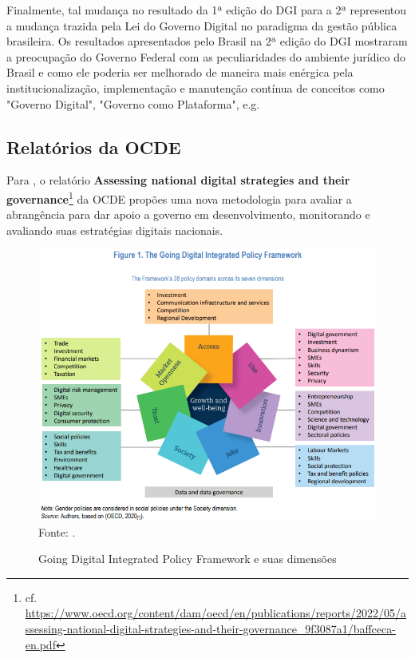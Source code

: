 Finalmente, tal mudança no resultado da 1ª edição do DGI para a 2ª representou a mudança trazida pela Lei do Governo Digital no paradigma da gestão pública brasileira. Os resultados apresentados pelo Brasil na 2ª edição do DGI mostraram a preocupação do Governo Federal com as peculiaridades do ambiente jurídico do Brasil e como ele poderia ser melhorado de maneira mais enérgica pela institucionalização, implementação e manutenção contínua  de conceitos como "Governo Digital", "Governo como Plataforma", e.g.

\subsection{Relatórios da OCDE}

Para \cite{going_digital_2022}, o relatório \textbf{Assessing national digital strategies and their governance}\footnote{cf. \url{https://www.oecd.org/content/dam/oecd/en/publications/reports/2022/05/assessing-national-digital-strategies-and-their-governance_9f3087a1/baffceca-en.pdf}} da OCDE propões uma nova metodologia para avaliar a abrangência para dar apoio a governo em desenvolvimento, monitorando e avaliando suas estratégias digitais nacionais.

\begin{figure}[H]
	\centering
	\caption{Going Digital Integrated Policy Framework e suas dimensões}
	\includegraphics[width=1\linewidth]{figuras/going_digital_integrated_policy_framework}
	\label{fig:ocde_going_digital}
	\footnotesize{Fonte: \cite{going_digital_2022}.}
\end{figure}

